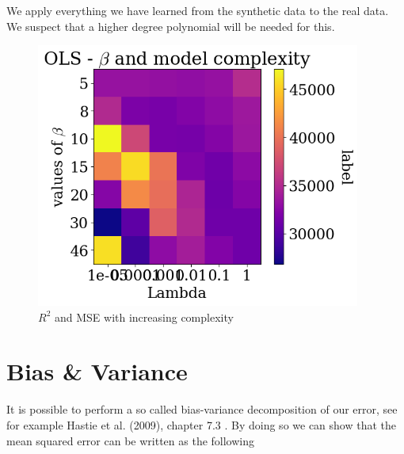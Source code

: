 \documentclass[twoside,11pt]{report}
\begin{document}
We apply everything we have learned from the synthetic data to the real data. We suspect that a higher degree polynomial will be needed for this.
\begin{figure}[!h]
    \begin{center}
        \includegraphics[width=0.95\textwidth]{../runsAndAdditions/heatmapRealData.png}
    \end{center}
    \caption{$R^2$ and MSE with increasing complexity}\label{fig:R2andMSEOLSReal}
\end{figure}



\section{Bias \& Variance}
\label{sec:biasvariance}

It is possible to perform a so called bias-variance decomposition of our error, 
see for example Hastie et al. (2009), chapter 7.3 \cite{hastie01statisticallearning}.
By doing so we can show that the mean squared error can be written as the following
\end{document}
